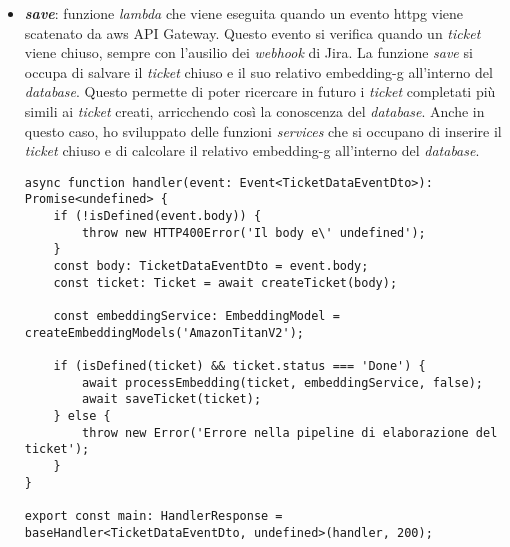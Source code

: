 \begin{itemize}
    \item \textbf{\textit{save}}: funzione \textit{lambda} che viene eseguita quando un evento \gls{httpg} viene scatenato da \gls{aws} API Gateway. Questo evento si verifica quando un \textit{ticket} viene chiuso, sempre con l'ausilio dei \textit{webhook} di Jira. La funzione \textit{save} si occupa di salvare il \textit{ticket} chiuso e il suo relativo \gls{embedding-g} all'interno del \textit{database}. Questo permette di poter ricercare in futuro i \textit{ticket} completati più simili ai \textit{ticket} creati, arricchendo così la conoscenza del \textit{database}.
    Anche in questo caso, ho sviluppato delle funzioni \textit{services} che si occupano di inserire il \textit{ticket} chiuso e di calcolare il relativo \gls{embedding-g} all'interno del \textit{database}.
    \begin{verbatim}
async function handler(event: Event<TicketDataEventDto>): Promise<undefined> {
    if (!isDefined(event.body)) {
        throw new HTTP400Error('Il body e\' undefined');
    }
    const body: TicketDataEventDto = event.body;
    const ticket: Ticket = await createTicket(body);
    
    const embeddingService: EmbeddingModel = createEmbeddingModels('AmazonTitanV2');
    
    if (isDefined(ticket) && ticket.status === 'Done') {
        await processEmbedding(ticket, embeddingService, false);
        await saveTicket(ticket);
    } else {
        throw new Error('Errore nella pipeline di elaborazione del ticket');
    }
}

export const main: HandlerResponse = baseHandler<TicketDataEventDto, undefined>(handler, 200);
    \end{verbatim}
    \vspace{-0.3cm}
\end{itemize}



